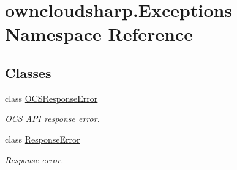\hypertarget{namespaceowncloudsharp_1_1_exceptions}{}\section{owncloudsharp.\+Exceptions Namespace Reference}
\label{namespaceowncloudsharp_1_1_exceptions}
\subsection*{Classes}
\begin{DoxyCompactItemize}
\item 
class \hyperlink{classowncloudsharp_1_1_exceptions_1_1_o_c_s_response_error}{O\+C\+S\+Response\+Error}
\begin{DoxyCompactList}\small\item\em O\+C\+S A\+P\+I response error. \end{DoxyCompactList}\item 
class \hyperlink{classowncloudsharp_1_1_exceptions_1_1_response_error}{Response\+Error}
\begin{DoxyCompactList}\small\item\em Response error. \end{DoxyCompactList}\end{DoxyCompactItemize}
